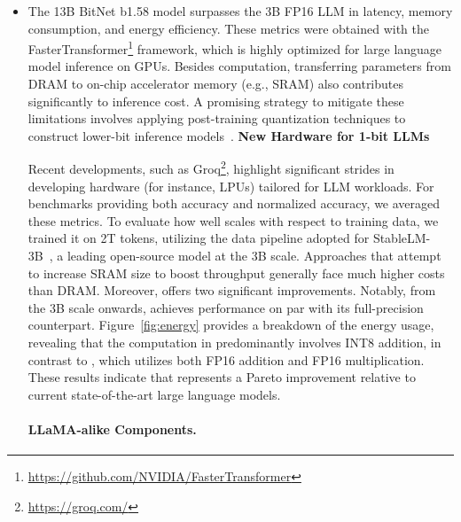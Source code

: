 \begin{itemize}
    \item The 13B BitNet b1.58 model surpasses the 3B FP16 LLM in latency, memory consumption, and energy efficiency. These metrics were obtained with the FasterTransformer\footnote{\url{https://github.com/NVIDIA/FasterTransformer}} framework, which is highly optimized for large language model inference on GPUs. Besides computation, transferring parameters from DRAM to on-chip accelerator memory (e.g., SRAM) also contributes significantly to inference cost. A promising strategy to mitigate these limitations involves applying post-training quantization techniques to construct lower-bit inference models~\cite{smoothquant, gptq, quip, quip_sharp}. \textbf{New Hardware for 1-bit LLMs}

Recent developments, such as Groq\footnote{\url{https://groq.com/}}, highlight significant strides in developing hardware (for instance, LPUs) tailored for LLM workloads. For benchmarks providing both accuracy and normalized accuracy, we averaged these metrics. To evaluate how well  scales with respect to training data, we trained it on 2T tokens, utilizing the data pipeline adopted for StableLM-3B~\cite{StableLM-3B-4E1T}, a leading open-source model at the 3B scale. Approaches that attempt to increase SRAM size to boost throughput generally face much higher costs than DRAM. Moreover,  offers two significant improvements. Notably, from the 3B scale onwards,  achieves performance on par with its full-precision counterpart. Figure~\ref{fig:energy} provides a breakdown of the energy usage, revealing that the computation in  predominantly involves INT8 addition, in contrast to , which utilizes both FP16 addition and FP16 multiplication. These results indicate that  represents a Pareto improvement relative to current state-of-the-art large language models. \paragraph{LLaMA-alike Components.}


\end{itemize}
